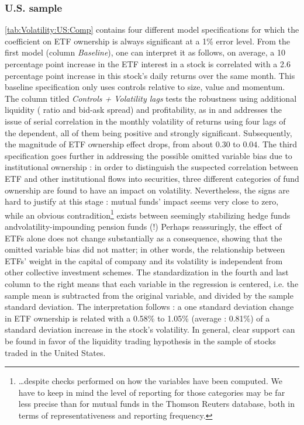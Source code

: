 \subsubsection{U.S. sample}
\autoref{tab:Volatility:US:Comp} contains four different model specifications for which the coefficient on ETF ownership is always significant at a 1\% error level. From the first model (column \textit{Baseline}), one can interpret it as follows, on average, a 10 percentage point increase in the ETF interest in a stock is correlated with a 2.6 percentage point increase in this stock's daily returns over the same month. This baseline specification only uses controls relative to size, value and momentum. The column titled \textit{Controls + Volatility lags} tests the robustness using additional liquidity (\textcite{Amihud2002} ratio and bid-ask spread) and profitability, as in \textcite{Ben-David2018} and addresses the issue of serial correlation in the monthly volatility of returns using four lags of the dependent, all of them being positive and strongly significant. Subsequently, the magnitude of ETF ownership effect drops, from about $0.30$ to $0.04$. The third specification goes further in addressing the possible omitted variable bias due to institutional ownership : in order to distinguish the suspected correlation between ETF and other institutional flows into securities, three different categories of fund ownership are found to have an impact on volatility. Nevertheless, the signs are hard to justify at this stage : mutual funds' impact seems very close to zero, while an obvious contradition\footnote{\dots despite checks performed on how the variables have been computed. We have to keep in mind the level of reporting for those categories may be far less precise than for mutual funds in the Thomson Reuters database, both in terms of representativeness and reporting frequency.} exists between seemingly stabilizing hedge funds andvolatility-impounding pension funds (!) Perhaps reassuringly, the effect of ETFs alone does not change substantially as a consequence, showing that the omitted variable bias did not matter; in other words, the relationship between ETFs' weight in the capital of company and its volatility is independent from other collective investment schemes. The standardization in the fourth and last column to the right means that each variable in the regression is centered, i.e. the sample mean is subtracted from the original variable, and divided by the sample standard deviation. The interpretation follows : a one standard deviation change in ETF ownership is related with a 0.58\% to 1.05\% (average : 0.81\%) of a standard deviation increase in the stock's volatility. In general, clear support can be found in favor of the liquidity trading hypothesis in the sample of stocks traded in the United States.

